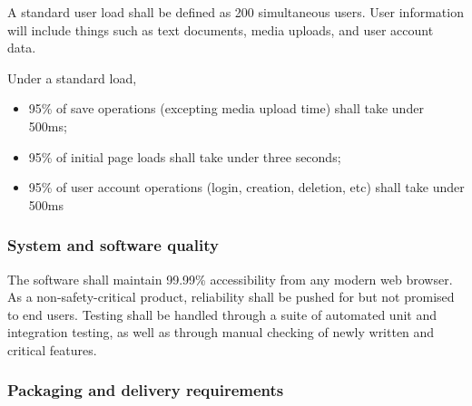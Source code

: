 \documentclass[letterpaper, 10pt, draftclsnofoot, onecolumn]{IEEEtran}
\begin{document}
{{A standard user load shall be defined as 200 simultaneous users. User information
will include things such as text documents, media uploads, and user account data.

Under a standard load,
\begin{itemize}
  \item 95\% of save operations (excepting media upload time) shall take under 500ms;
  \item 95\% of initial page loads shall take under three seconds;
  \item 95\% of user account operations (login, creation, deletion, etc) shall take under 500ms
\end{itemize}

\subsubsection[System and software
quality]{\rmfamily\bfseries\color{black} System
and software quality}

The software shall maintain 99.99\% accessibility from any modern web browser.
As a non-safety-critical product, reliability shall be pushed for but not promised
to end users. Testing shall be handled through a suite of automated unit and integration testing, as well as
through manual checking of newly written and critical features.

\subsubsection[Packaging and delivery
requirements]{\rmfamily\bfseries\color{black}
Packaging and delivery requirements}


}}
\end{document}
